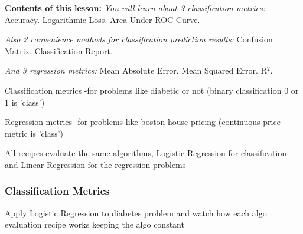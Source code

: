 \documentclass[11pt]{article}
\begin{document}
\textbf{Contents of this lesson:}
\emph{You will learn about 3 classification metrics:}
Accuracy.
Logarithmic Loss.
Area Under ROC Curve.

\emph{Also 2 convenience methods for classification prediction results:}
Confusion Matrix.
Classification Report.

\emph{And 3 regression metrics:}
Mean Absolute Error.
Mean Squared Error.
R\(^{\text{2}}\).

Classification metrics
-for problems like diabetic or not (binary classification 0 or 1 is 'class')

Regression metrics
-for problems like boston house pricing (continuous price metric is 'class')

All recipes evaluate the same algorithms, Logistic Regression for
classification and Linear Regression for the regression problems

\subsubsection{Classification Metrics}
\label{sec:org4e25b5e}
Apply Logistic Regression to diabetes problem and watch how each algo evaluation recipe works
keeping the algo constant
\end{document}
